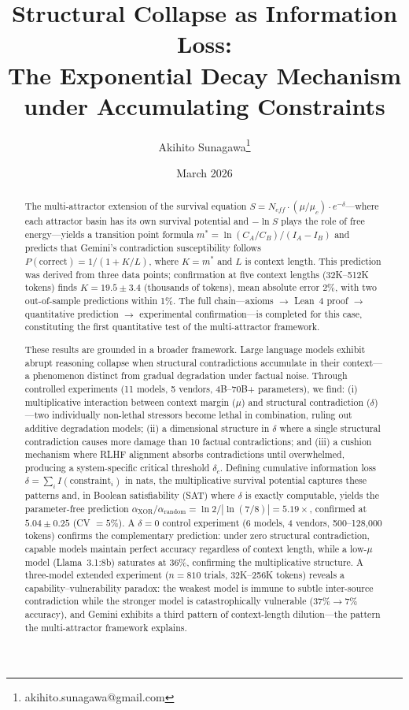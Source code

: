 \documentclass[11pt,a4paper]{article}
\title{Structural Collapse as Information Loss:\\
The Exponential Decay Mechanism under Accumulating Constraints}
\author{Akihito Sunagawa\thanks{akihito.sunagawa@gmail.com}}
\date{March 2026}
\begin{document}
\maketitle

\begin{abstract}
The multi-attractor extension of the survival equation $S = N_{eff} \cdot (\mu/\mu_c) \cdot e^{-\delta}$---where each attractor basin has its own survival potential and $-\ln S$ plays the role of free energy---yields a transition point formula $m^* = \ln(C_A/C_B)/(I_A - I_B)$ and predicts that Gemini's contradiction susceptibility follows $P(\text{correct}) = 1/(1 + K/L)$, where $K = m^*$ and $L$ is context length. This prediction was derived from three data points; confirmation at five context lengths (32K--512K tokens) finds $K = 19.5 \pm 3.4$ (thousands of tokens), mean absolute error 2\%, with two out-of-sample predictions within 1\%. The full chain---axioms $\to$ Lean~4 proof $\to$ quantitative prediction $\to$ experimental confirmation---is completed for this case, constituting the first quantitative test of the multi-attractor framework.

These results are grounded in a broader framework. Large language models exhibit abrupt reasoning collapse when structural contradictions accumulate in their context---a phenomenon distinct from gradual degradation under factual noise. Through controlled experiments (11 models, 5 vendors, 4B--70B+ parameters), we find: (i) multiplicative interaction between context margin ($\mu$) and structural contradiction ($\delta$)---two individually non-lethal stressors become lethal in combination, ruling out additive degradation models; (ii) a dimensional structure in $\delta$ where a single structural contradiction causes more damage than 10 factual contradictions; and (iii) a cushion mechanism where RLHF alignment absorbs contradictions until overwhelmed, producing a system-specific critical threshold $\delta_c$. Defining cumulative information loss $\delta = \sum_i I(\text{constraint}_i)$ in nats, the multiplicative survival potential captures these patterns and, in Boolean satisfiability (SAT) where $\delta$ is exactly computable, yields the parameter-free prediction $\alpha_{\text{XOR}}/\alpha_{\text{random}} = \ln 2 / |\ln(7/8)| = 5.19\times$, confirmed at $5.04 \pm 0.25$ (CV $= 5\%$). A $\delta = 0$ control experiment (6 models, 4 vendors, 500--128{,}000 tokens) confirms the complementary prediction: under zero structural contradiction, capable models maintain perfect accuracy regardless of context length, while a low-$\mu$ model (Llama~3.1:8b) saturates at 36\%, confirming the multiplicative structure. A three-model extended experiment ($n = 810$ trials, 32K--256K tokens) reveals a capability--vulnerability paradox: the weakest model is immune to subtle inter-source contradiction while the stronger model is catastrophically vulnerable ($37\% \to 7\%$ accuracy), and Gemini exhibits a third pattern of context-length dilution---the pattern the multi-attractor framework explains.


\end{abstract}
\end{document}
